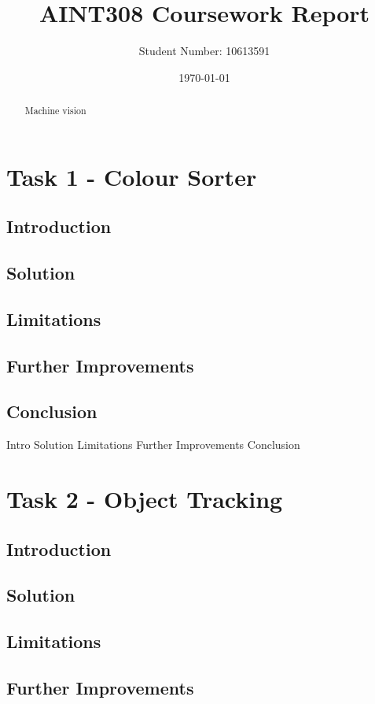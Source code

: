 \documentclass{article}
\begin{document}
\title{AINT308 Coursework Report}
\author{Student Number: 10613591}
\date{\today}
\maketitle

\newpage

\tableofcontents

\newpage

\begin{abstract}
Machine vision 
\end{abstract}

\section{Task 1 - Colour Sorter}
\subsection{Introduction}
\subsection{Solution}
\subsection{Limitations}
\subsection{Further Improvements}
\subsection{Conclusion}
Intro
Solution
Limitations
Further Improvements
Conclusion 
\section{Task 2 - Object Tracking}
\subsection{Introduction}
\subsection{Solution}
\subsection{Limitations}
\subsection{Further Improvements}
\end{document}
